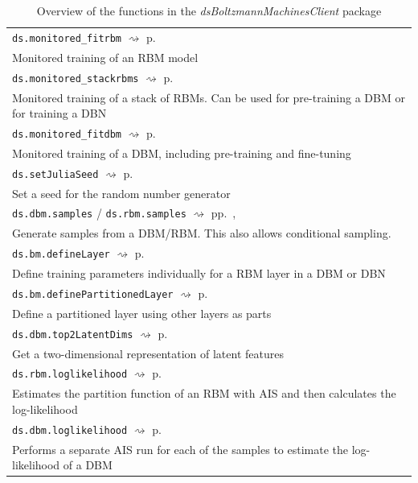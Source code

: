 \documentclass[12pt]{article}
\newcommand{\inlinecode}[1]{\texttt{#1}}
\newcommand{\apkg}[1]{\emph{#1}}
\newcommand{\rightpageref}[1]{\hfill $\rightsquigarrow$ p.\ \pageref{#1}}
\newcommand{\rightpagerefs}[2]{\hfill $\rightsquigarrow$ pp.\ \pageref{#1}, \pageref{#2}}
\begin{document}
\begin{table}[!htb]
\caption{Overview of the functions in the \apkg{dsBoltzmannMachinesClient} package}
\label{tab:dsBoltzmannFuns}
   \begin{tabularx}{\textwidth}{X}
   \Xhline{1pt}
\inlinecode{ds.monitored\_fitrbm} \rightpageref{rdokitem_ds.monitored.Rul.fitrbm} \\
Monitored training of an RBM model \\
\inlinecode{ds.monitored\_stackrbms} \rightpageref{rdokitem_ds.monitored.Rul.stackrbms} \\
Monitored training of a stack of RBMs. Can be used for pre-training a DBM or for training a DBN \\
\inlinecode{ds.monitored\_fitdbm} \rightpageref{rdokitem_ds.monitored.Rul.fitdbm} \\
Monitored training of a DBM, including pre-training and fine-tuning \\
\inlinecode{ds.setJuliaSeed} \rightpageref{rdokitem_ds.setJuliaSeed} \\
Set a seed for the random number generator \\
\inlinecode{ds.dbm.samples} / \inlinecode{ds.rbm.samples} \rightpagerefs{rdokitem_ds.dbm.samples}{rdokitem_ds.rbm.samples} \\
Generate samples from a DBM/RBM.
This also allows conditional sampling.\\
\inlinecode{ds.bm.defineLayer} \rightpageref{rdokitem_ds.bm.defineLayer} \\
Define training parameters individually for a RBM layer in a DBM or DBN \\
\inlinecode{ds.bm.definePartitionedLayer} \rightpageref{rdokitem_ds.bm.definePartitionedLayer} \\
Define a partitioned layer using other layers as parts \\
\inlinecode{ds.dbm.top2LatentDims} \rightpageref{rdokitem_ds.dbm.top2LatentDims} \\
Get a two-dimensional representation of latent features \\
\inlinecode{ds.rbm.loglikelihood} \rightpageref{rdokitem_ds.rbm.loglikelihood} \\
Estimates the partition function of an RBM with AIS and then calculates the log-likelihood \\
\inlinecode{ds.dbm.loglikelihood} \rightpageref{rdokitem_ds.dbm.loglikelihood} \\
Performs a separate AIS run for each of the samples to estimate the log-likelihood of a DBM \\

\end{tabularx}
\end{table}
\end{document}
